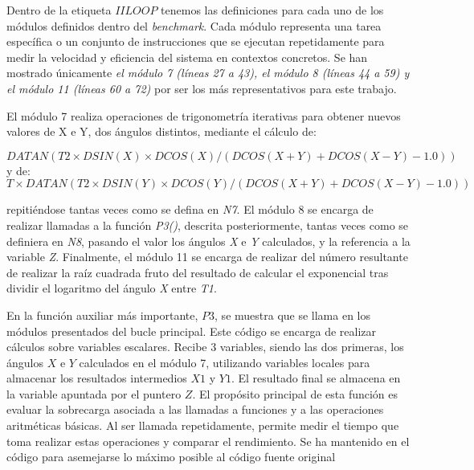 \par{Dentro de la etiqueta $IILOOP$ tenemos las definiciones para cada uno de los módulos definidos dentro del \textit{benchmark}. Cada módulo representa una tarea específica o un conjunto de instrucciones que se ejecutan repetidamente para medir la velocidad y eficiencia del sistema en contextos concretos. Se han mostrado únicamente \textit{el módulo 7 (líneas 27 a 43), el módulo 8 (líneas 44 a 59) y el módulo 11 (líneas 60 a 72)} por ser los más representativos para este trabajo.}

\par{El módulo 7 realiza operaciones de trigonometría iterativas para obtener nuevos valores de X e Y, dos ángulos distintos, mediante el cálculo de:

\begin{equation}DATAN(T2 \times DSIN(X) \times DCOS(X) / (DCOS(X+Y) + DCOS(X-Y) - 1.0))\end{equation}
y de:
\begin{equation}T \times DATAN(T2 \times DSIN(Y) \times DCOS(Y) / (DCOS(X+Y) + DCOS(X-Y) - 1.0))\end{equation}

repitiéndose tantas veces como se defina en \textit{N7}. El módulo 8 se encarga de realizar llamadas a la función \textit{P3()}, descrita posteriormente, tantas veces como se definiera en \textit{N8}, pasando el valor los ángulos \textit{X} e \textit{Y} calculados, y la referencia a la variable \textit{Z}. Finalmente, el módulo 11 se encarga de realizar del número resultante de realizar la raíz cuadrada fruto del resultado de calcular el exponencial tras dividir el logaritmo del ángulo \textit{X} entre \textit{T1}.}

\par{En la función auxiliar más importante, $P3$, se muestra que se llama en los módulos presentados del bucle principal. Este código se encarga de realizar cálculos sobre variables escalares. Recibe 3 variables, siendo las dos primeras, los ángulos $X$ e $Y$ calculados en el módulo 7, utilizando variables locales para almacenar los resultados intermedios $X1$ y $Y1$. El resultado final se almacena en la variable apuntada por el puntero $Z$. El propósito principal de esta función es evaluar la sobrecarga asociada a las llamadas a funciones y a las operaciones aritméticas básicas. Al ser llamada repetidamente, permite medir el tiempo que toma realizar estas operaciones y comparar el rendimiento. Se ha mantenido en el código para asemejarse lo máximo posible al código fuente original}

